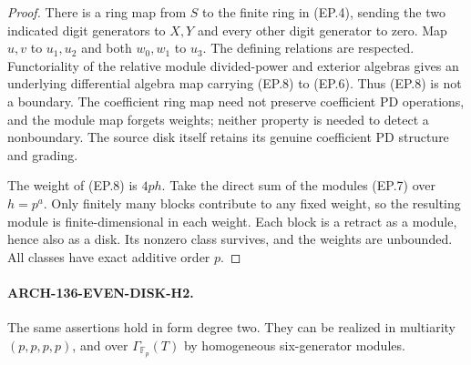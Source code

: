 \begin{proof}
There is a ring map from \(S\) to the finite ring in
(EP.4), sending the two indicated digit generators to
\(X,Y\) and every other digit generator to zero. Map
\(u,v\) to \(u_1,u_2\) and both \(w_0,w_1\) to
\(u_3\). The defining relations are respected. Functoriality
of the relative module divided-power and exterior algebras
gives an underlying differential algebra map carrying
(EP.8) to (EP.6). Thus (EP.8) is not a boundary.
The coefficient ring map need not preserve coefficient PD
operations, and the module map forgets weights; neither
property is needed to detect a nonboundary. The source disk
itself retains its genuine coefficient PD structure and grading.

The weight of (EP.8) is \(4ph\). Take the direct sum of
the modules (EP.7) over \(h=p^a\). Only finitely many blocks
contribute to any fixed weight, so the resulting module is
finite-dimensional in each weight. Each block is a retract
as a module, hence also as a disk. Its nonzero class survives,
and the weights are unbounded. All classes have exact
additive order \(p\).
\end{proof}

\paragraph{ARCH-136-EVEN-DISK-H2.}
The same assertions hold in form degree two. They can be
realized in multiarity \((p,p,p,p)\), and over
\(\Gamma_{\mathbb F_p}(T)\) by homogeneous six-generator
modules.


